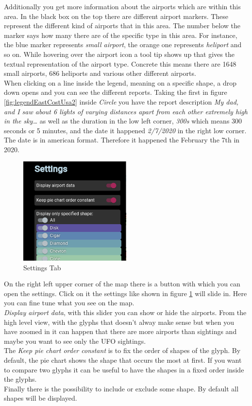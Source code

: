 \documentclass{article}
\begin{document}
Additionally you get more information about the airports which are within this area. In the 
black box on the top there are different airport markers. These represent the different kind of airports
that in this area. The number below the marker says how many there are of the specific type
in this area. For instance, the blue marker represents \textit{small airport}, the orange
one represents \textit{heliport} and so on. While hovering over the airport icon a tool tip
shows up that gives the textual representation of the airport type. Concrete this means there are 
1648 small airports, 686 heliports and various other different airports. 
\\
When clicking on a line inside the legend, meaning on a specific shape, a drop down opens and you
can see the different reports. Taking the first in figure \ref{fig:legendEastCostUsa2} inside \textit{Circle}
you have the report description 
\textit{My dad, and I saw about 6 lights of varying distances apart from each other extremely high in the sky…}
as well as the duration in the low left corner, \textit{300s} which means 300 seconds 
or 5 minutes, and the date it happened \textit{2/7/2020} in the right low corner. The date is in 
american format. Therefore it happened the February the 7th in 2020.
\\
\newpage
\begin{figure} 
    \centering
    \includegraphics[width=0.5\textwidth]{SettingsTap}
    \caption{Settings Tab}
    \label{fig:SettingsTap}
\end{figure}

On the right left upper corner of the map there is a button with which you can open the settings.
Click on it the settings like shown in figure \ref{fig:SettingsTap} will slide in. Here you can fine tune
what you see on the map. \\
\textit{Display airport data}, with this slider you can show or hide the airports. From the high level view,
with the glyphs that doesn't alway make sense but when you have zoomed in it can happen that there
are more airports than sightings and maybe you want to see only the UFO sightings.
\\
The \textit{Keep pie chart order constant} is to fix the order of shapes of the glyph. By default, the pie chart
shows the shape that occurs the most at first. If you want to compare two glyphs it can be useful to have the
shapes in a fixed order inside the glyphs.
\\
Finally there is the possibility to include or exclude some shape. By default all shapes will be displayed.
\\
\end{document}
